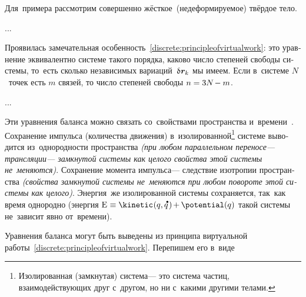 \begin{otherlanguage}{russian}
Для~примера рассмотрим совершенно жёсткое~(недеформируемое) твёрдое тело.

...


Проявилась замечательная особенность~\eqref{discrete:principleofvirtualwork}: это уравнение эквивалентно системе такого порядка, каково число степеней свободы системы, то~есть сколько независимых вариаций~${\variation{\hspace{.1ex}\locationvector_k}}$ мы имеем.
Если в~системе $N$~точек есть $m$ связей, то число степеней свободы ${n = 3N \hspace{-0.25ex} - m}$.

...




Эти уравнения баланса можно связать со~свойствами пространства и~времени~\cite{landau.lifshitz-shortcourse}. Сохранение импульса (количества движения) в~изолированной\footnote{Изолированная (замкнутая) система\:--- это система частиц, взаимодействующих друг с~другом, но ни с~какими другими телами.}\hspace{-0.25ex} системе выводится из~однородности пространства \emph{(при любом параллельном переносе\:--- трансляции\:--- замкнутой системы как целого свойства этой системы не~меняются)}. Сохранение момента импульса\:--- следствие изотропии пространства \emph{(свойства замкнутой системы не~меняются при любом повороте этой системы как целого)}. Энергия~же изолированной системы сохраняется, так~как время однородно (энергия ${\mathrm{E} \hspace{.1ex} \equiv \kinetic \hspace{.1ex} (q, \mathdotabove{q} \hspace{.2ex}) \hspace{-0.2ex} + \hspace{-0.1ex} \potential(q)}$ такой системы не~зависит явно от~времени).

Уравнения баланса могут быть выведены из принципа виртуальной работы~\eqref{discrete:principleofvirtualwork}.
Перепишем его в~виде


\end{otherlanguage}
